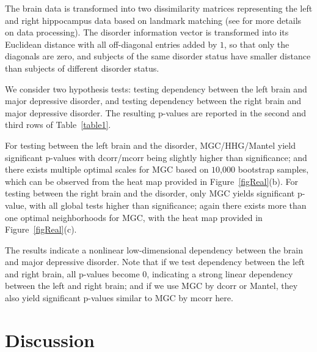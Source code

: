 \documentclass[11pt]{article}
\begin{document}
The brain data is transformed into two dissimilarity matrices representing the left and right hippocampus data based on landmark matching (see \cite{ParkEtAl2011} for more details on data processing). The disorder information vector is transformed into its Euclidean distance with all off-diagonal entries added by $1$, so that only the diagonals are zero, and subjects of the same disorder status have smaller distance than subjects of different disorder status.

We consider two hypothesis tests: testing dependency between the left brain and major depressive disorder, and testing dependency between the right brain and major depressive disorder. The resulting p-values are reported in the second and third rows of Table~\ref{table1}.

For testing between the left brain and the disorder, MGC/HHG/Mantel yield significant p-values with dcorr/mcorr being slightly higher than significance; and there exists multiple optimal scales for MGC based on $10$,$000$ bootstrap samples, which can be observed from the heat map provided in Figure~\ref{figReal}(b). For testing between the right brain and the disorder, only MGC yields significant p-value, with all global tests higher than significance; again there exists more than one optimal neighborhoods for MGC, with the heat map provided in Figure~\ref{figReal}(c). 


The results indicate a nonlinear low-dimensional dependency between the brain and major depressive disorder. Note that if we test dependency between the left and right brain, all p-values become $0$, indicating a strong linear dependency between the left and right brain; and if we use MGC by dcorr or Mantel, they also yield significant p-values similar to MGC by mcorr here.

\section{Discussion}
\label{conclu}
\end{document}
